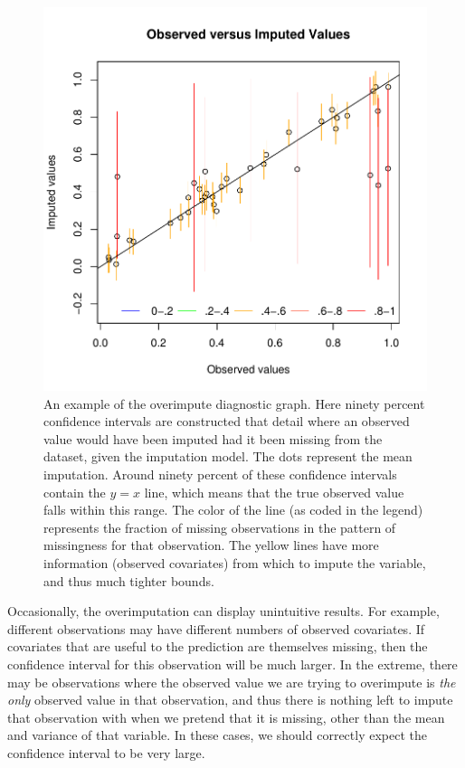 \documentclass[12pt,titlepage]{article}
\begin{document}
\begin{figure}[htp!]
  \centering \includegraphics[scale=.8]{overimp}
  \caption{An example of the overimpute diagnostic graph.  Here
    ninety percent confidence intervals are constructed that detail
    where an observed value would have been imputed had it been
    missing from the dataset, given the imputation model.  The dots
    represent the mean imputation.  Around ninety percent of these
    confidence intervals contain the $y=x$ line, which means that the
    true observed value falls within this range.  The color of the
    line (as coded in the legend) represents the fraction of missing
    observations in the pattern of missingness for that observation.
    The yellow lines have more information (observed covariates) from
    which to impute the variable, and thus much tighter bounds.}
  \label{f:oi}
\end{figure}
Occasionally, the overimputation can display unintuitive results.  For
example, different observations may have different numbers of observed
covariates.  If covariates that are useful to the prediction are
themselves missing, then the confidence interval for this observation
will be much larger.  In the extreme, there may be observations where
the observed value we are trying to overimpute is \emph{the only}
observed value in that observation, and thus there is nothing left to
impute that observation with when we pretend that it is missing, other
than the mean and variance of that variable.  In these cases, we
should correctly expect the confidence interval to be very large.
\end{document}
